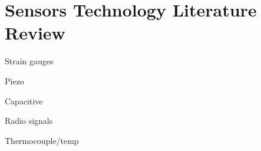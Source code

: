 \chapter{Sensors Technology Literature Review\label{chap:sensor_bg}}

Strain gauges

Piezo

Capacitive

Radio signals

Thermocouple/temp

